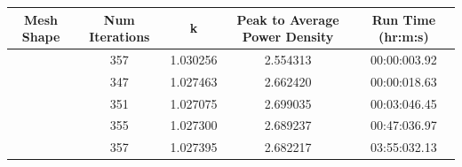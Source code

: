 \begin{tabular}{|c|c|c|c|c|}
\hline
Mesh Shape & Num Iterations & k & Peak to Average Power Density & Run Time (hr:m:s) \\ \hline
\hline
[9, 9, 19] & 357 & 1.030256 & 2.554313 & 00:00:003.92 \\ \hline
[18, 18, 19] & 347 & 1.027463 & 2.662420 & 00:00:018.63 \\ \hline
[36, 36, 38] & 351 & 1.027075 & 2.699035 & 00:03:046.45 \\ \hline
[72, 72, 76] & 355 & 1.027300 & 2.689237 & 00:47:036.97 \\ \hline
[108, 108, 114] & 357 & 1.027395 & 2.682217 & 03:55:032.13 \\ \hline
\hline
\end{tabular}
